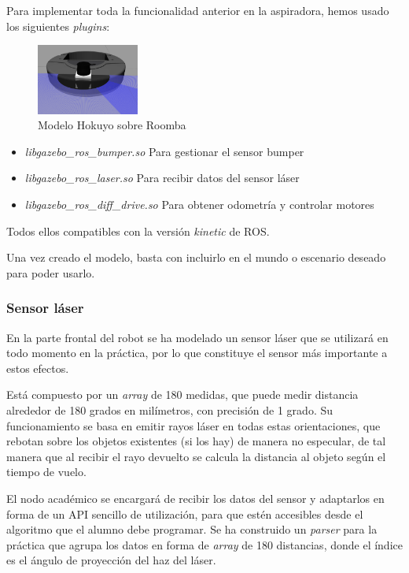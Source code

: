 Para implementar toda la funcionalidad anterior en la aspiradora, hemos usado los siguientes \textit{plugins}:

\begin{multicols}{2}
	\begin{figure}[H]
	\begin{center}
		\includegraphics[width=0.3\textwidth]{figures/hokuyo.png}
		\caption{Modelo Hokuyo sobre Roomba}
		\label{fig.hokuyo}
		\end{center}
\end{figure}

\begin{itemize}
	\item \textit{libgazebo\_ros\_bumper.so} 
Para gestionar el sensor bumper
	\item \textit{libgazebo\_ros\_laser.so}  
Para recibir datos del sensor láser
	\item \textit{libgazebo\_ros\_diff\_drive.so } 
Para obtener odometría y controlar motores
\end{itemize}
\end{multicols}

Todos ellos compatibles con la versión \textit{kinetic} de ROS.

Una vez creado el modelo, basta con incluirlo en el mundo o escenario deseado para poder usarlo.

\subsubsection{Sensor láser}
En la parte frontal del robot se ha modelado un sensor láser que se utilizará en todo momento en la práctica, por lo que constituye el sensor más importante a estos efectos. 

Está compuesto por un \textit{array} de 180 medidas, que puede medir distancia alrededor de 180 grados en milímetros, con precisión de 1 grado. Su funcionamiento se basa en emitir rayos láser en todas estas orientaciones, que rebotan sobre los objetos existentes (si los hay) de manera no especular, de tal manera que al recibir el rayo devuelto se calcula la distancia al objeto según el tiempo de vuelo.

El nodo académico se encargará de recibir los datos del sensor y adaptarlos en forma de un API sencillo de utilización, para que estén accesibles desde el algoritmo que el alumno debe programar. Se ha construido un \textit{parser} para la práctica que agrupa los datos en forma de \textit{array} de 180 distancias, donde el índice es el ángulo de proyección del haz del láser.
 
